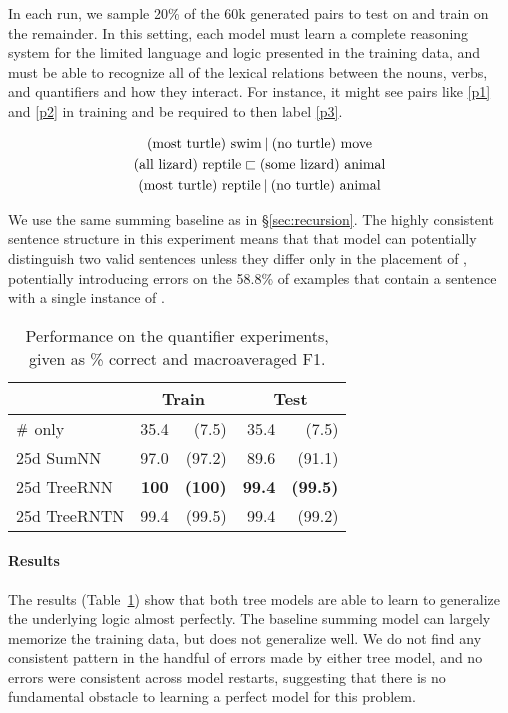 In each run, we sample 20\% of the 60k generated pairs to test on and 
train on the remainder. In this setting, each model must learn a
complete reasoning system for the limited language and logic presented
in the training data, and must be able
to recognize all of the lexical relations between the nouns, verbs,
and quantifiers and how they interact. For instance, it might see
pairs like \eqref{p1} and \eqref{p2} in training and be required to 
then label \eqref{p3}.

\vspace{-0.6cm}
\begin{gather}
  \text{(most turtle) swim} \mathbin{|} \text{(no turtle) move}\label{p1}
  \\
  \text{(all lizard) reptile} \sqsubset  \text{(some lizard) animal}\label{p2}
  \\
  \text{(most turtle) reptile} \mathbin{|} \text{(no turtle) animal}\label{p3}
\end{gather}

We use the same summing baseline as in \S\ref{sec:recursion}.
The highly consistent  sentence structure in this experiment means
that that model can potentially distinguish two valid sentences unless they
 differ only in the placement of , potentially introducing errors on 
the 58.8\% of examples that contain a sentence with a single
instance of .

\begin{table}[tp]
  \centering\small
    \begin{tabular}{ l r@{ \ }r r@{ \ }r }
    
    \toprule
    ~ & \multicolumn{2}{c}{Train} & \multicolumn{2}{c}{Test} \\
    \midrule
    $\mathbin{\#}$ only &	35.4 & (7.5)	& 35.4	& (7.5)\\
    25d SumNN	&	97.0&	(97.2)&	89.6&	(91.1)\\	
    25d TreeRNN	&	\textbf{100}&	\textbf{(100)}&	\textbf{99.4}&	\textbf{(99.5)}\\
    25d TreeRNTN	&	99.4&(99.5)&	99.4 & (99.2)\\
    \bottomrule
  \end{tabular}
  
  \caption{Performance on the quantifier experiments, given as \% correct and macroaveraged F1.}
  \label{qresultstable}
\end{table} 

%
%
\paragraph{Results} The results (Table~\ref{qresultstable}) show that both tree models are able to learn to generalize the underlying logic almost perfectly. The baseline summing model can largely memorize the training data, but does not generalize well. We do not find any consistent pattern in the handful of errors made by either tree model, and no errors were consistent across model restarts, suggesting that there is no fundamental obstacle to learning a perfect model for this problem.

